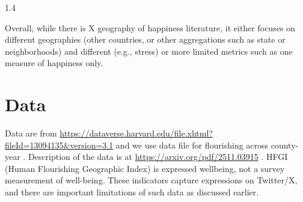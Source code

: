 \documentclass[10pt, letterpaper]{article}
\begin{document}
\begin{spacing}{1.4}

Overall, while there is X geography of happiness literature, it either
focuses on different geographies (other countries, or other aggregations such as
state or neighborhoods) and different (e.g., stress) or more limited metrics such
as one measure of happiness only. 



\section{Data} 
               
Data are from
\url{https://dataverse.harvard.edu/file.xhtml?fileId=13094135&version=3.1} and
we use data file for flourishing across county-year%
. Description of the data is at
\url{https://arxiv.org/pdf/2511.03915} \citep{iacus25b}.
HFGI (Human Flourishing Geographic Index) is expressed wellbeing,
not a survey measurement of well-being. These indicators capture
expressions on Twitter/X, and there are important limitations of such data as
discussed earlier.




\end{spacing}
\end{document}
